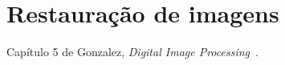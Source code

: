 \chapter{Restauração de imagens}

Capítulo 5 de Gonzalez, \textit{Digital Image Processing}~\cite{gonzalez2006image}.
